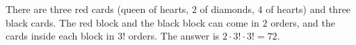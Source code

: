 There are three red cards (queen of hearts, $2$ of diamonds, $4$ of hearts) and three black cards. The red block and the black block can come in $2$ orders, and the cards inside each block in $3!$ orders. The answer is $2\cdot3!\cdot3!=\boxed{72}$.
